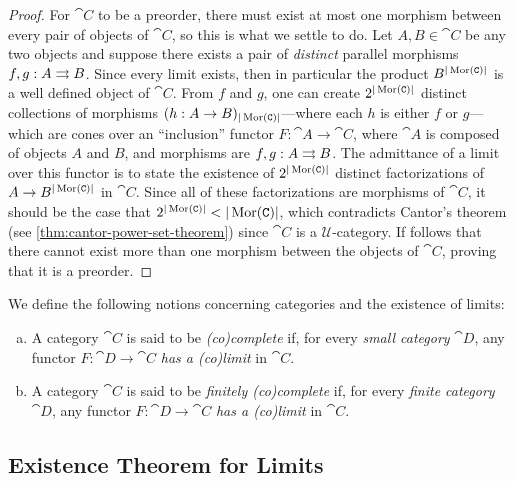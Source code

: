 \begin{proof}
    For \(\cat C\) to be a preorder, there must exist at most one morphism between
    every pair of objects of \(\cat C\), so this is what we settle to do. Let
    \(A, B \in \cat C\) be any two objects and suppose there exists a pair of
    \emph{distinct} parallel morphisms \(f, g: A \rightrightarrows B\). Since every limit
    exists, then in particular the product \(B^{|\operatorname{Mor}(\texttt C)|}\) is a well defined
    object of \(\cat C\). From \(f\) and \(g\), one can create
    \(2^{|\operatorname{Mor}(\texttt C)|}\) distinct collections of morphisms
    \((h: A \to B)_{|\operatorname{Mor}(\texttt C)|}\)---where each \(h\) is either \(f\) or
    \(g\)---which are cones over an ``inclusion'' functor \(F: \cat A \to \cat C\),
    where \(\cat A\) is composed of objects \(A\) and \(B\), and morphisms are
    \(f, g: A \rightrightarrows B\). The admittance of a limit over this functor is to state the
    existence of \(2^{|\operatorname{Mor}(\texttt C)|}\) distinct factorizations of
    \(A \to B^{|\operatorname{Mor}(\texttt C)|}\) in \(\cat C\). Since all of these factorizations
    are morphisms of \(\cat C\), it should be the case that
    \(2^{|\operatorname{Mor}(\texttt C)|} < |\operatorname{Mor}(\texttt C)|\), which contradicts Cantor's theorem (see
    \cref{thm:cantor-power-set-theorem}) since \(\cat C\) is a
    \(\mathcal{U}\)-category. If follows that there cannot exist more than one
    morphism between the objects of \(\cat C\), proving that it is a preorder.
\end{proof}

\begin{definition}[Completeness]
    \label{def:completeness-categories}
    We define the following notions concerning categories and the existence of
    limits:
    \begin{enumerate}[(a)]\setlength\itemsep{0em}
        \item A category \(\cat C\) is said to be \emph{(co)complete} if, for every
              \emph{small category} \(\cat D\), any functor \(F: \cat D \to \cat C\)
              \emph{has a (co)limit} in \(\cat C\).

        \item A category \(\cat C\) is said to be \emph{finitely (co)complete} if, for
              every \emph{finite category} \(\cat D\), any functor \(F: \cat D \to \cat C\)
              \emph{has a (co)limit} in \(\cat C\).
    \end{enumerate}
\end{definition}

\subsection{Existence Theorem for Limits}

